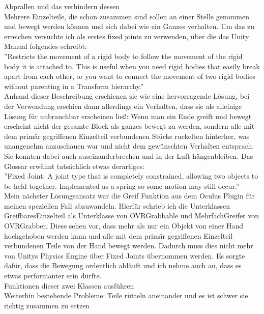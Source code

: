 \documentclass[11pt]{article} %
\begin{document}
Abprallen und das verhindern dessen\\

Mehrere Einzelteile, die schon zusammen sind sollen an einer Stelle genommen und bewegt werden können und sich dabei wie ein Ganzes verhalten.
Um das zu erreichen versuchte ich als erstes fixed joints zu verwenden, über die das Unity Manual folgendes schreibt: \\
''Restricts the movement of a rigid body to follow the movement of the rigid body it is attached to. This is useful when you need rigid bodies that easily break apart from each other, or you want to connect the movement of two rigid bodies without parenting in a Transform hierarchy.'' \\
Anhand dieser Beschreibung erschienen sie wie eine hervorragende Lösung, bei der Verwendung erschien dann allerdings ein Verhalten, dass sie als alleinige Lösung für unbrauchbar erscheinen ließ: Wenn man ein Ende greift und bewegt erscheint nicht der gesamte Block als ganzes bewegt zu werden, sondern alle mit dem primär gegriffenen Einzelteil verbundenen Stücke ruckelten hinterher, was unangenehm anzuschauen war und nicht dem gewünschten Verhalten entsprach.
Sie konnten dabei auch auseinanderbrechen und in der Luft hängenbleiben.
Das Glossar erwähnt tatsächlich etwas derartiges: \\
''Fixed Joint:
A joint type that is completely constrained, allowing two objects to be held together. Implemented as a spring so some motion may still occur.'' \\

Mein nächster Lösungsansatz war die Greif Funktion aus dem Oculus Plugin für meinen speziellen Fall abzuwandeln. Hierfür schrieb ich die Unterklassen GreifbaresEinzelteil als Unterklasse von OVRGrabbable und MehrfachGreifer von OVRGrabber.
Diese sehen vor, dass mehr als nur ein Objekt von einer Hand hochgehoben werden kann und alle mit dem primär gegriffenen Einzelteil verbundenen Teile von der Hand bewegt werden. Dadurch muss dies nicht mehr von Unitys Physics Engine über Fixed Joints übernommen werden.
Es sorgte dafür, dass die Bewegung ordentlich abläuft und ich nehme auch an, dass es etwas performanter sein dürfte.\\

Funktionen dieser zwei Klassen ausführen\\

Weiterhin bestehende Probleme: 
Teile rütteln aneinander und 
es ist schwer sie richtig zusammen zu setzen
\end{document}
